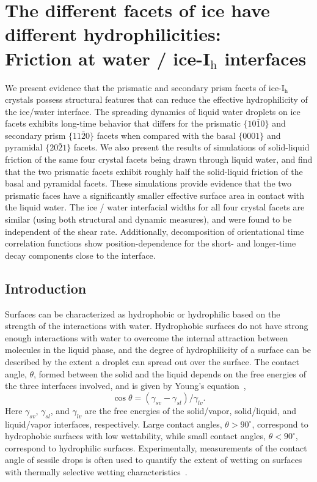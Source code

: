 \chapter{The different facets of ice have different hydrophilicities: \\
  Friction at water / ice-I$_\mathrm{h}$ interfaces}

  We present evidence that the prismatic and secondary prism facets of
  ice-I$_\mathrm{h}$ crystals possess structural features that can
  reduce the effective hydrophilicity of the ice/water interface. The
  spreading dynamics of liquid water droplets on ice facets exhibits
  long-time behavior that differs for the prismatic
  $\{10\bar{1}0\}$ and secondary prism $\{11\bar{2}0\}$ facets
  when compared with the basal $\{0001\}$ and pyramidal
  $\{20\bar{2}1\}$ facets.  We also present the results of
  simulations of solid-liquid friction of the same four crystal facets
  being drawn through liquid water, and find that the two prismatic
  facets exhibit roughly half the solid-liquid friction of the basal
  and pyramidal facets.  These simulations provide evidence that the
  two prismatic faces have a significantly smaller effective surface
  area in contact with the liquid water. The ice / water interfacial
  widths for all four crystal facets are similar (using both
  structural and dynamic measures), and were found to be independent
  of the shear rate.  Additionally, decomposition of orientational
  time correlation functions show position-dependence for the short-
  and longer-time decay components close to the interface.

\section{Introduction}
Surfaces can be characterized as hydrophobic or hydrophilic
based on the strength of the interactions with water. Hydrophobic
surfaces do not have strong enough interactions with water to overcome
the internal attraction between molecules in the liquid phase, and the
degree of hydrophilicity of a surface can be described by the extent a
droplet can spread out over the surface. The contact angle, $\theta$,
formed between the solid and the liquid depends on the free energies
of the three interfaces involved, and is given by Young's
equation~\cite{Young05},
\begin{equation}\label{young}
\cos\theta = (\gamma_{sv} - \gamma_{sl})/\gamma_{lv} .
\end{equation} 
Here $\gamma_{sv}$, $\gamma_{sl}$, and $\gamma_{lv}$ are the free
energies of the solid/vapor, solid/liquid, and liquid/vapor interfaces,
respectively.  Large contact angles, $\theta > 90^{\circ}$, correspond
to hydrophobic surfaces with low wettability, while small contact
angles, $\theta < 90^{\circ}$, correspond to hydrophilic surfaces.
Experimentally, measurements of the contact angle of sessile drops is
often used to quantify the extent of wetting on surfaces with
thermally selective wetting
characteristics~\cite{Tadanaga00,Liu04,Sun04}.

